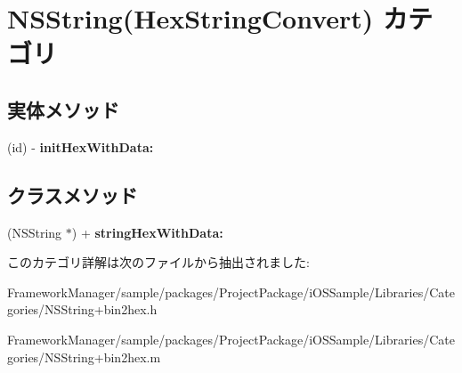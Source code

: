 \hypertarget{category_n_s_string_07_hex_string_convert_08}{}\section{N\+S\+String(Hex\+String\+Convert) カテゴリ}
\label{category_n_s_string_07_hex_string_convert_08}
\subsection*{実体メソッド}
\begin{DoxyCompactItemize}
\item 
\hypertarget{category_n_s_string_07_hex_string_convert_08_af42224178e8b7f0ee9f0eabd528cb621}{}(id) -\/ {\bfseries init\+Hex\+With\+Data\+:}\label{category_n_s_string_07_hex_string_convert_08_af42224178e8b7f0ee9f0eabd528cb621}

\end{DoxyCompactItemize}
\subsection*{クラスメソッド}
\begin{DoxyCompactItemize}
\item 
\hypertarget{category_n_s_string_07_hex_string_convert_08_a90d7f5adb8d60c5fbd3775d6a5dd41ce}{}(N\+S\+String $\ast$) + {\bfseries string\+Hex\+With\+Data\+:}\label{category_n_s_string_07_hex_string_convert_08_a90d7f5adb8d60c5fbd3775d6a5dd41ce}

\end{DoxyCompactItemize}


このカテゴリ詳解は次のファイルから抽出されました\+:\begin{DoxyCompactItemize}
\item 
Framework\+Manager/sample/packages/\+Project\+Package/i\+O\+S\+Sample/\+Libraries/\+Categories/N\+S\+String+bin2hex.\+h\item 
Framework\+Manager/sample/packages/\+Project\+Package/i\+O\+S\+Sample/\+Libraries/\+Categories/N\+S\+String+bin2hex.\+m\end{DoxyCompactItemize}
